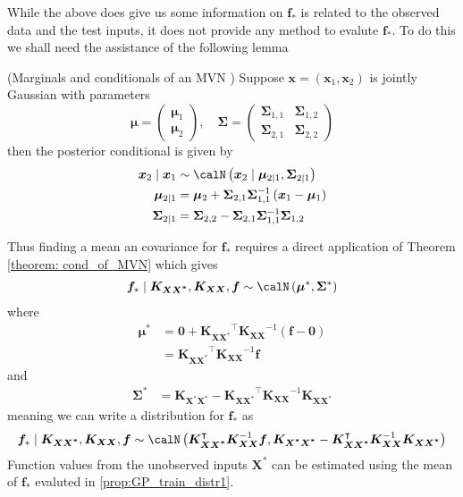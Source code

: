 While the above does give us some information on $\bm{f}_{\ast}$ is related to the observed data and the test inputs, it does not provide any method to evalute $\bm{f}_{\ast}$. To do this we shall need the assistance of the following lemma
\begin{thm}\label{theorem: cond_of_MVN}
	(Marginals and conditionals of an MVN \cite{MurphyKevinP2012Ml}) Suppose $\bm{x} = (\bm{x}_1, \bm{x}_2)$ is jointly Gaussian with parameters
	\[
		\bm{\mu} =
		\begin{pmatrix}
			\bm{\mu}_1 \\
			\bm{\mu}_2
		\end{pmatrix}, \quad
		\bm{\Sigma} =
		\begin{pmatrix}
			\bm{\Sigma}_{1,1} & \bm{\Sigma}_{1,2} \\
			\bm{\Sigma}_{2,1} & \bm{\Sigma}_{2,2}
		\end{pmatrix}
	\]
	then the posterior conditional is given by
	\begin{align*}
		\bm{x}_2 \mid \bm{x}_1 & \sim \calN \left( \bm{x}_2 \mid \bm{\mu}_{2 \mid 1}, \bm{\Sigma}_{2 \mid 1} \right)          \\
		\bm{\mu}_{2 \mid 1}    & = \bm{\mu}_2 + \bm{\Sigma}_{2,1} \bm{\Sigma}_{1,1}^{-1} \left( \bm{x}_1 - \bm{\mu}_1 \right) \\
		\bm{\Sigma}_{2 \mid 1} & = \bm{\Sigma}_{2,2} - \bm{\Sigma}_{2,1} \bm{\Sigma}_{1,1}^{-1} \bm{\Sigma}_{1,2}
	\end{align*}
\end{thm}

Thus finding a mean an covariance for $\bm{f}_{\ast}$ requires a direct application of Theorem \ref{theorem: cond_of_MVN} which gives
\begin{align*}
	\bm{f}_{\ast} \mid \bm{K_{XX^{\ast}}} , \bm{K_{XX}}, \bm{f} \sim \calN \left( \bm{\mu}^{\ast}, \bm{\Sigma}^{\ast} \right)
\end{align*}
where
\begin{align*}
	\bm{\mu}^{\ast} & = \bm{0} + \bm{K_{XX^{\ast}}}^{\intercal} \bm{K_{XX}}^{-1} \left( \bm{f} - \bm{0} \right) \\
	                & = \bm{K_{XX^{\ast}}}^{\intercal} \bm{K_{XX}}^{-1} \bm{f}
\end{align*}
and
\begin{align*}
	\bm{\Sigma}^{\ast} & = \bm{K_{X^{\ast}X^{\ast}}} - \bm{K_{XX^{\ast}}}^{\intercal} \bm{K_{XX}}^{-1} \bm{K_{XX^{\ast}}}
\end{align*}
meaning we can write a distribution for $\bm{f}_{\ast}$ as
\begin{equation}\label{prop:GP_train_distr1}
	\bm{f}_{\ast} \mid \bm{K_{XX^{\ast}}} , \bm{K_{XX}}, \bm{f} \sim \calN \left( \bm{K_{XX^{\ast}}}^{\intercal} \bm{K_{XX}}^{-1} \bm{f},  \bm{K_{X^{\ast}X^{\ast}}} - \bm{K_{XX^{\ast}}}^{\intercal} \bm{K_{XX}}^{-1} \bm{K_{XX^{\ast}}}  \right)
\end{equation}
Function values from the unobserved inputs $\bm{X^{\ast}}$ can be estimated using the mean of $\bm{f}_{\ast}$ evaluted in \ref{prop:GP_train_distr1}.

